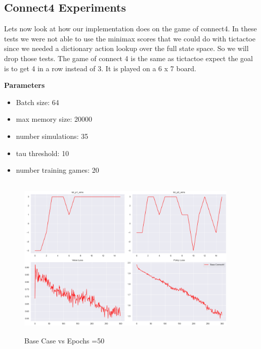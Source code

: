\subsection{Connect4 Experiments}

Lets now look at how our implementation does on the game of connect4. In these tests we were not able to use the minimax scores that we could do with tictactoe since we needed a dictionary action lookup over the full state space. So we will drop those tests. The game of connect 4 is the same as tictactoe expect the goal is to get 4 in a row instead of 3. It is played on a 6 x 7 board. 

\textbf{Parameters}

\begin{multicols}{2}

\begin{itemize}
    \item Batch size: 64
    \item max memory size: 20000
    \item number simulations: 35

\end{itemize}

\begin{itemize}
    \item tau threshold: 10
    \item number training games: 20
\end{itemize}

\end{multicols}

\begin{figure}[H]
       \centering
       \includegraphics[width=400px,height=300px]{experiments/base_connect4.png}
       \caption{Base Case vs Epochs =50}
       \label{fig:my_label}
\end{figure}